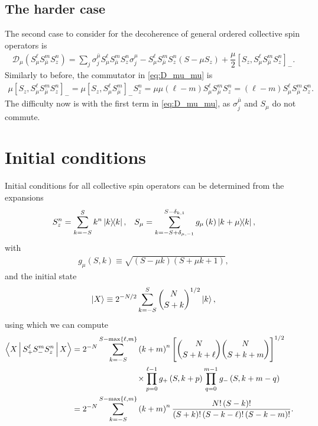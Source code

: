 \documentclass[aps,notitlepage,nofootinbib,11pt]{revtex4-1}
\newcommand{\f}[2]{\dfrac{#1}{#2}} %
\newcommand{\p}[1]{\left(#1\right)} %
\renewcommand{\sp}[1]{\left[#1\right]} %
\renewcommand{\set}[1]{\left\{#1\right\}} %
\newcommand{\bk}{\Braket} %
\newcommand{\D}{\mathcal{D}}
\newcommand{\bmu}{{\bar\mu}}
\newcommand{\1}{\mathds{1}}
\begin{document}
\subsection{The harder case}

The second case to consider for the decoherence of general ordered
collective spin operators is
\begin{align}
  \D_\mu\p{S_\mu^\ell S_\bmu^m S_z^n}
  = \sum_j \sigma_j^\bmu S_\mu^\ell S_\bmu^m S_z^n \sigma_j^\mu
  - S_\mu^\ell S_\bmu^m S_z^n \p{S - \mu S_z}
  + \f{\mu}{2} \sp{S_z, S_\mu^\ell S_\bmu^m S_z^n}_-.
  \label{eq:D_mu_mu}
\end{align}
Similarly to before, the commutator in \eqref{eq:D_mu_mu} is
\begin{align}
  \mu \sp{S_z, S_\mu^\ell S_\bmu^m S_z^n}_-
  = \mu \sp{S_z, S_\mu^\ell S_\bmu^m}_- S_z^n
  = \mu\mu \p{\ell-m} S_\mu^\ell S_\bmu^m S_z^n
  = \p{\ell-m} S_\mu^\ell S_\bmu^m S_z^n.
\end{align}
The difficulty now is with the first term in \eqref{eq:D_mu_mu}, as
$\sigma_j^\bmu$ and $S_\mu$ do not commute.


\section{Initial conditions}
\label{sec:initial_conditions}

Initial conditions for all collective spin operators can be determined
from the expansions
\begin{align}
  S_z^n = \sum_{k=-S}^S k^n \op{k},
  &&
  S_\mu
  = \sum_{k=-S+\delta_{\mu,-1}}^{S-\delta_{k,1}}
  g_\mu\p{k} \op{k+\mu}{k},
\end{align}
with
\begin{align}
  g_\mu\p{S,k} \equiv \sqrt{\p{S-\mu k}\p{S+\mu k+1}},
\end{align}
and the initial state
\begin{align}
  \ket{X} \equiv 2^{-N/2} \sum_{k=-S}^S { N \choose S+k }^{1/2} \ket{k},
\end{align}
using which we can compute
\begin{align}
  \bk{X|S_+^\ell S_-^m S_z^n|X}
  &=  2^{-N} \sum_{k=-S}^{S-\max\set{\ell,m}} \p{k+m}^n
  \sp{{ N \choose S+k+\ell } { N \choose S+k+m }}^{1/2} \tag*{} \\
  &\qquad\qquad\qquad\qquad
  \times \prod_{p=0}^{\ell-1} g_+\p{S,k+p}
  \prod_{q=0}^{m-1} g_-\p{S,k+m-q} \\
  &= 2^{-N} \sum_{k=-S}^{S-\max\set{\ell,m}} \p{k+m}^n
  \f{N!\p{S-k}!}{\p{S+k}!\p{S-k-\ell}!\p{S-k-m}!}.
\end{align}
\end{document}
